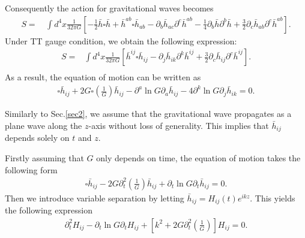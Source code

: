 \documentclass[prd,aps,a4paper,superscriptaddress,onecolumn,nofootinbib]{revtex4}
\begin{document}
Consequently the action for gravitational waves becomes
\begin{equation}
\begin{aligned}
S = & \, \int d^4x\frac{1}{32\pi G}\left[  -\frac{1}{2} \bar{h}\square \bar{h} + \bar{h}^{ab}\square \bar{h}_{ab} - \partial_b \bar{h}_{ac}\partial^c \bar{h}^{ab} - \frac{1}{4}\partial_b\bar{h} \partial^b\bar{h} + \frac{3}{2}\partial_c \bar{h}_{ab}\partial^c \bar{h}^{ab} \right].
\end{aligned}
\end{equation}
Under TT gauge condition, we obtain the following expression:
\begin{equation}
\begin{aligned}
S = & \int d^4x \frac{1}{32 \pi G}\left[ \bar{h}^{ij}\square \bar{h}_{ij} - \partial_j \bar{h}_{ik}\partial^k \bar{h}^{ij} + \frac{3}{2}\partial_c \bar{h}_{ij}\partial^c \bar{h}^{ij} \right]. \\
\end{aligned}
\end{equation}
As a result, the equation of motion can be written as
\begin{equation}
\begin{aligned}
\square \bar{h}_{ij} + 2G\square \left(\frac{1}{G} \right)\bar{h}_{ij} - \partial^a \ln G \partial_a\bar{h}_{ij} - 4\partial^k \ln G\partial_j \bar{h}_{ik} = 0.
\end{aligned}
\end{equation}

Similarly to Sec.\ref{sec2}, we assume that the gravitational wave propagates as a plane wave along the $z$-axis without loss of generality. This implies that $\bar{h}_{ij}$ depends solely on $t$ and $z$.

Firstly assuming that $G$ only depends on time, the equation of motion takes the following form
\begin{equation}
\begin{aligned}
\square \bar{h}_{ij} - 2G\partial_t^2 \left(\frac{1}{G} \right)\bar{h}_{ij} + \partial_t\ln G \partial_t\bar{h}_{ij} = 0.
\end{aligned}
\end{equation}
Then we introduce variable separation by letting $\bar{h}_{ij} = H_{ij}(t)e^{ikz}$.
This yields the following expression
\begin{equation}\label{eht}
\begin{aligned}
\partial_t^2H_{ij} - \partial_t\ln G\partial_tH_{ij} + \left[k^2 + 2G\partial_t^2 \left(\frac{1}{G} \right)\right] H_{ij} = 0.
\end{aligned}
\end{equation}
\end{document}
